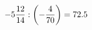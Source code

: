 \documentclass[preview]{standalone}
\begin{document}
\begin{align*}
-5 { 12 \over 14 }  :  \left( - { 4 \over 70 } \right) = 72.5
\end{align*}
\end{document}
